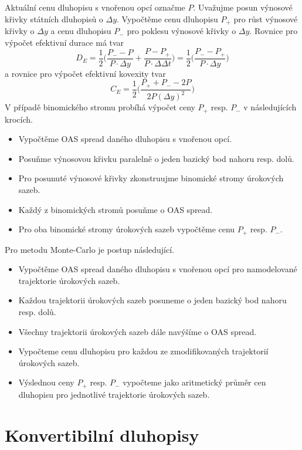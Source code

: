 \documentclass[a4paper]{book}
\begin{document}
Aktuální cenu dluhopisu s vnořenou opcí označme $P$. Uvažujme posun výnosové křivky státních dluhopisů o $\Delta y$. Vypočtěme cenu dluhopisu $P_{+}$ pro růst výnosové křivky o $\Delta y$ a cenu dluhopisu $P_{-}$ pro poklesu výnosové křivky o $\Delta y$. Rovnice pro výpočet efektivní durace má tvar
\begin{equation*}
D_{E} = \frac{1}{2}\Bigg( \frac{P_{-} - P}{P \cdot \Delta y} + \frac{P - P_{+}}{P \cdot \Delta \Delta t}\Bigg) = \frac{1}{2}\Bigg( \frac{P_{-} - P_{+}}{P \cdot \Delta y} \Bigg)
\end{equation*}
a rovnice pro výpočet efektivní kovexity tvar
\begin{equation*}
C_{E} = \frac{1}{2}\Bigg( \frac{P_{+} + P_{-} - 2P}{2P(\Delta y)^2} \Bigg)
\end{equation*}
V případě binomického stromu probíhá výpočet ceny $P_{+}$ resp. $P_{-}$ v následujících krocích.
\begin{itemize}
\item Vypočtěme OAS spread daného dluhopisu s vnořenou opcí.
\item Posuňme výnosovou křivku paralelně o jeden bazický bod nahoru resp. dolů.
\item Pro posunuté výnosové křivky zkonstruujme binomické stromy úrokových sazeb.
\item Každý z binomických stromů posuňme o OAS spread.
\item Pro oba binomické stromy úrokových sazeb vypočtěme cenu $P_{+}$ resp. $P_{-}$.
\end{itemize}
Pro metodu Monte-Carlo je postup následující.
\begin{itemize}
\item Vypočtěme OAS spread daného dluhopisu s vnořenou opcí pro namodelované trajektorie úrokových sazeb.
\item Každou trajektorii úrokových sazeb posuneme o jeden bazický bod nahoru resp. dolů.
\item Všechny trajektorii úrokových sazeb dále navýšíme o OAS spread.
\item Vypočteme cenu dluhopisu pro každou ze zmodifikovaných trajektorií úrokových sazeb.
\item Výslednou ceny $P_{+}$ resp. $P_{-}$ vypočteme jako aritmetický průměr cen dluhopisu pro jednotlivé trajektorie úrokových sazeb.
\end{itemize}

\section{Konvertibilní dluhopisy}
\end{document}
